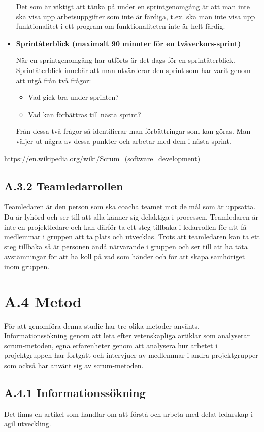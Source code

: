 \begin{itemize}
Det som är viktigt att tänka på under en sprintgenomgång är att man inte ska visa upp arbetsuppgifter som inte är färdiga, t.ex. ska man inte visa upp funktionalitet i ett program om funktionaliteten inte är helt färdig.

\item \textbf{Sprintåterblick (maximalt 90 minuter för en tvåveckors-sprint)}

När en sprintgenomgång har utförts är det dags för en sprintåterblick. Sprintåterblick innebär att man utvärderar den sprint som har varit genom att utgå från två frågor:

\begin{itemize}
	\item Vad gick bra under sprinten?
	\item Vad kan förbättras till nästa sprint?
\end{itemize}

Från dessa två frågor så identifierar man förbättringar som kan göras. Man väljer ut några av dessa punkter och arbetar med dem i nästa sprint.

\end{itemize}
https://en.wikipedia.org/wiki/Scrum_(software_development)

\subsection{A.3.2 Teamledarrollen}
Teamledaren är den person som ska coacha teamet mot de mål som är uppsatta. Du är lyhörd och ser till att alla känner sig delaktiga i processen. Teamledaren är inte en projektledare och kan därför ta ett steg tillbaka i ledarrollen för att få medlemmar i gruppen att ta plats och utvecklas.\cite{teamledare} Trots att teamledaren kan ta ett steg tillbaka så är personen ändå närvarande i gruppen och ser till att ha täta avstämningar för att ha koll på vad som händer och för att skapa samhöriget inom gruppen.\cite{teamguide}

\section{A.4 Metod}
För att genomföra denna studie har tre olika metoder använts. Informationssökning genom att leta efter vetenskapliga artiklar som analyserar scrum-metoden, egna erfarenheter genom att analysera hur arbetet i projektgruppen har fortgått och intervjuer av medlemmar i andra projektgrupper som också har använt sig av scrum-metoden.

\subsection{A.4.1 Informationssökning}
Det finns en artikel som handlar om att förstå och arbeta med delat ledarskap i agil utveckling. \cite{sharedleader}

